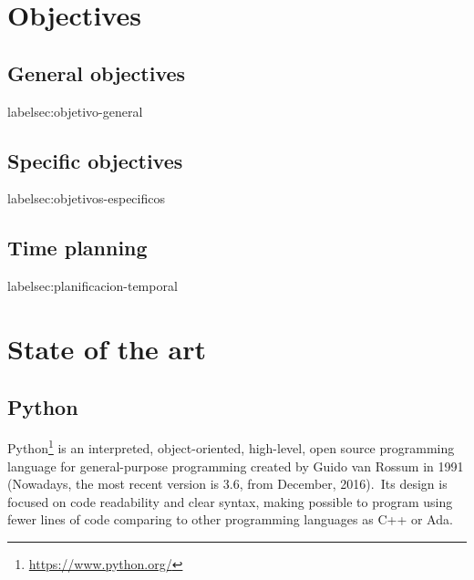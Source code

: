 \documentclass[a4paper, 12pt]{book}
\begin{document}
\chapter{Objectives}
\label{chap:objetivos}

\section{General objectives}
label{sec:objetivo-general}


\section{Specific objectives}
label{sec:objetivos-especificos}


\section{Time planning}
label{sec:planificacion-temporal}




\cleardoublepage
\chapter{State of the art}




\section{Python}
\label{sec:python}
Python\footnote{\url{https://www.python.org/}} is an interpreted, object-oriented, high-level, open source
programming language for general-purpose programming created by Guido van Rossum in 1991 (Nowadays, the most
recent version is 3.6, from December, 2016).\ Its design is focused on code readability and clear syntax, making
possible to program using fewer lines of code comparing to other programming languages as C++ or Ada.\
\end{document}
